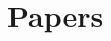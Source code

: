 \documentclass[a4paper,fleqn,usenatbib]{mnras}
\begin{document}









\appendix

\section{Papers}






\bsp	%
\label{lastpage}
\end{document}
